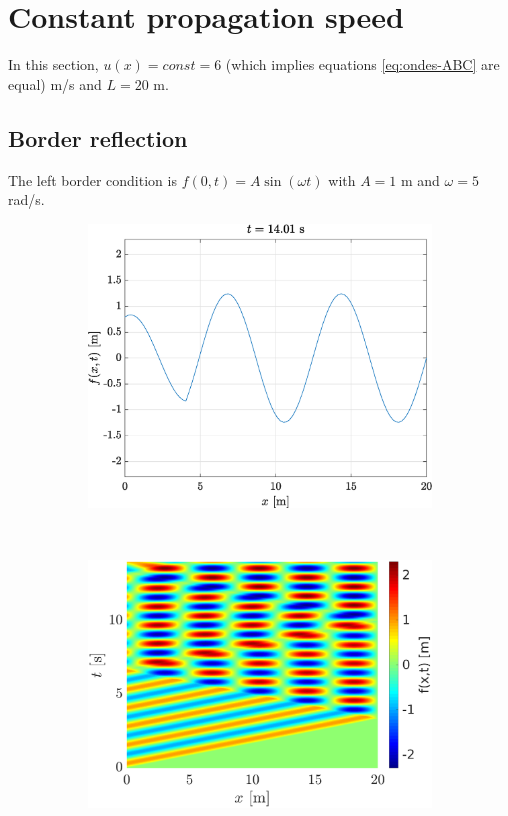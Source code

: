 \documentclass[a4paper,12pt,twoside]{article}
\begin{document}
    \newpage

    \section{Constant propagation speed}
    In this section, $u(x)=const=6$ (which implies equations \eqref{eq:ondes-ABC} are equal) m/s and $L=20$ m.

    \subsection{Border reflection}
    The left border condition is $f(0,t)=A\sin(\omega t)$ with $A=1$ m and $\omega=5$ rad/s.

    \begin{figure}[h!]
    \begin{subfigure}{0.5\textwidth}
    \includegraphics[width=\textwidth]{graphs/ex1ffixe.eps}
    \end{subfigure}
    ~
    \begin{subfigure}{0.55\textwidth}
    \includegraphics[width=\textwidth]{graphs/ex1xtfixe.eps}
    \end{subfigure}\


\end{figure}
\end{document}
